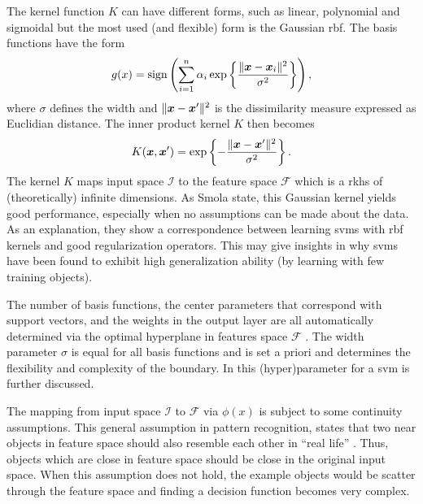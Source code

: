 The kernel function $K$ can have different forms, such as linear, polynomial and sigmoidal but the most used (and flexible) form is the Gaussian \gls{rbf}.
The basis functions have the form
\begin{equation}
  g(x) = \operatorname*{sign} \left(  \sum_{i=1}^{n} \alpha_i \operatorname*{exp} \left\{ \frac{\rVert \vectorsym{x} - \vectorsym{x}_i \rVert ^2}{\sigma^2} \right\} \right),
\end{equation}
where $\sigma$ defines the width and $\rVert \vectorsym{x} - \vectorsym{x}' \rVert ^2$ is the dissimilarity measure expressed as Euclidian distance.
The inner product kernel $K$ then becomes
\begin{equation}
  K(\vectorsym{x}, \vectorsym{x}') = \operatorname*{exp} \left\{ - \frac{ \rVert \vectorsym{x} - \vectorsym{x}' \rVert ^2}{\sigma^2} \right\}.
\end{equation}
The kernel $K$ maps input space $\mathcal{I}$ to the feature space $\mathcal{F}$ which is a \gls{rkhs} of (theoretically) infinite dimensions.
As Smola \etal \cite{smola1998connection} state, this Gaussian kernel yields good performance, especially when no assumptions can be made about the data.
As an explanation, they show a correspondence between learning \glspl{svm} with \gls{rbf} kernels and good regularization operators.
This may give insights in why \glspl{svm} have been found to exhibit high generalization ability (by learning with few training objects).

The number of basis functions, the center parameters that correspond with support vectors, and the weights in the output layer are all automatically determined via the optimal hyperplane in features space $\mathcal{F}$ \cite{cherkassky2007learning}.
The width parameter $\sigma$ is equal for all basis functions and is set a priori and determines the flexibility and complexity of the boundary.
In  this (hyper)parameter for a \gls{svm} is further discussed.

The mapping from input space $\mathcal{I}$ to $\mathcal{F}$ via $\phi(x)$ is subject to some continuity assumptions.
This general assumption in pattern recognition, states that two near objects in feature space should also resemble each other in ``real life'' \cite{tax2001one}.
Thus, objects which are close in feature space should be close in the original input space.
When this assumption does not hold, the example objects would be scatter through the feature space and finding a decision function becomes very complex.

